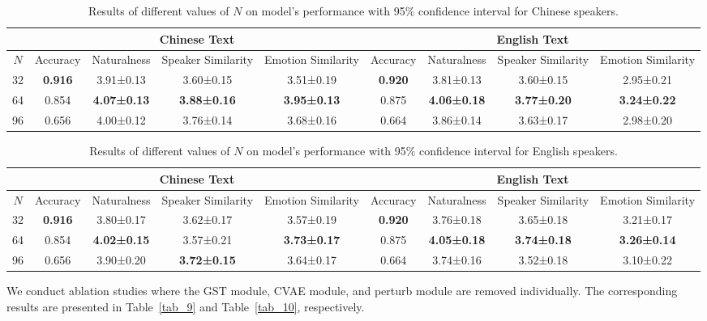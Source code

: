 \documentclass[journal,comsoc]{IEEEtran}
\begin{document}
\begin{table}[]
\centering
\caption{Results of different values of $N$ on model's performance with 95$\%$ confidence interval for Chinese speakers.}
\label{tab_11}
\begin{tabular}{@{}c|cccc|cccc@{}}
\toprule
   & \multicolumn{4}{c|}{Chinese Text}                                             & \multicolumn{4}{c}{English Text}                                              \\ \midrule
$N$  & Accuracy       & Naturalness        & Speaker Similarity & Emotion Similarity & Accuracy       & Naturalness        & Speaker Similarity & Emotion Similarity \\ \midrule
32 & \textbf{0.916} & 3.91±0.13          & 3.60±0.15          & 3.51±0.19          & \textbf{0.920} & 3.81±0.13          & 3.60±0.15          & 2.95±0.21          \\
64 & 0.854          & \textbf{4.07±0.13} & \textbf{3.88±0.16} & \textbf{3.95±0.13} & 0.875          & \textbf{4.06±0.18} & \textbf{3.77±0.20} & \textbf{3.24±0.22} \\
96 & 0.656          & 4.00±0.12          & 3.76±0.14          & 3.68±0.16          & 0.664          & 3.86±0.14          & 3.63±0.17          & 2.98±0.20          \\ \bottomrule
\end{tabular}
\end{table}

\begin{table}[]
\centering
\caption{Results of different values of $N$ on model's performance with 95$\%$ confidence interval for English speakers.}
\label{tab_12}
\begin{tabular}{@{}c|cccc|cccc@{}}
\toprule
   & \multicolumn{4}{c|}{Chinese Text}                                             & \multicolumn{4}{c}{English Text}                                              \\ \midrule
$N$  & Accuracy       & Naturalness        & Speaker Similarity & Emotion Similarity & Accuracy       & Naturalness        & Speaker Similarity & Emotion Similarity \\ \midrule
32 & \textbf{0.916} & 3.80±0.17          & 3.62±0.17          & 3.57±0.19          & \textbf{0.920} & 3.76±0.18          & 3.65±0.18          & 3.21±0.17          \\
64 & 0.854          & \textbf{4.02±0.15} & 3.57±0.21          & \textbf{3.73±0.17} & 0.875          & \textbf{4.05±0.18} & \textbf{3.74±0.18} & \textbf{3.26±0.14} \\
96 & 0.656          & 3.90±0.20          & \textbf{3.72±0.15} & 3.64±0.17          & 0.664          & 3.74±0.16          & 3.52±0.18          & 3.10±0.22          \\ \bottomrule
\end{tabular}
\end{table}
We conduct ablation studies where the GST module, CVAE module, and perturb module are removed individually. The corresponding results are presented in Table~\ref{tab_9} and Table~\ref{tab_10}, respectively.
\end{document}
